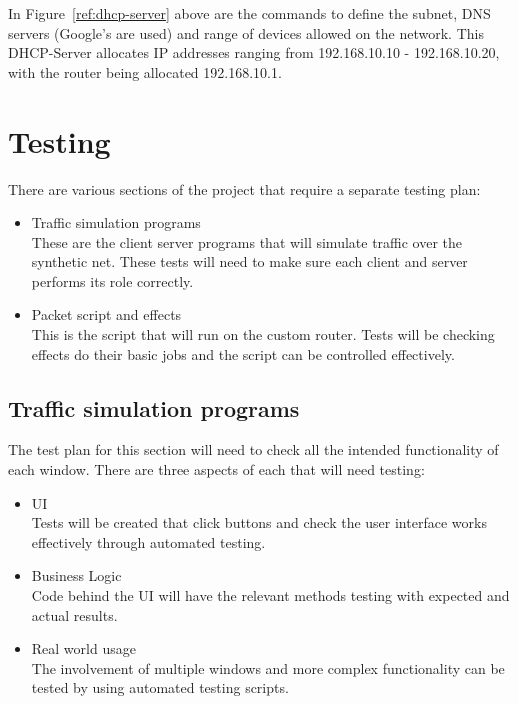 In Figure~\ref{ref:dhcp-server} above are the commands to define the subnet, DNS servers (Google's are used) and range of devices allowed on the network. This DHCP-Server allocates IP addresses ranging from 192.168.10.10 - 192.168.10.20, with the router being allocated 192.168.10.1.


\section{Testing}
There are various sections of the project that require a separate testing plan:

\begin{itemize}

	\item Traffic simulation programs\\
	These are the client server programs that will simulate traffic over the synthetic net. These tests will need to 	make 	sure each client and server performs its role correctly.
	
	\item Packet script and effects\\
	This is the script that will run on the custom router. Tests will be checking effects do their basic jobs and the script can be controlled effectively.
	
\end{itemize}

\subsection{Traffic simulation programs}
The test plan for this section will need to check all the intended functionality of each window. There are three aspects of each that will need testing:

\begin{itemize}

	\item UI \\
	Tests will be created that click buttons and check the user interface works effectively through automated testing.

	\item Business Logic \\
	Code behind the UI will have the relevant methods testing with expected and actual results.

	\item Real world usage \\
	The involvement of multiple windows and more complex functionality can be tested by using automated testing 			scripts.
	
\end{itemize}

